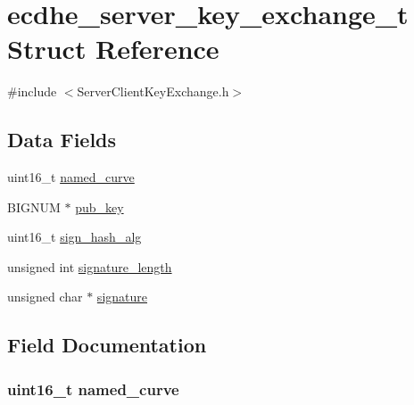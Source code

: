 \hypertarget{structecdhe__server__key__exchange__t}{}\section{ecdhe\+\_\+server\+\_\+key\+\_\+exchange\+\_\+t Struct Reference}
\label{structecdhe__server__key__exchange__t}


{\ttfamily \#include $<$Server\+Client\+Key\+Exchange.\+h$>$}

\subsection*{Data Fields}
\begin{DoxyCompactItemize}
\item 
uint16\+\_\+t \hyperlink{structecdhe__server__key__exchange__t_a5754cc60d6f7a74a313db0e4bc607b07}{named\+\_\+curve}
\item 
B\+I\+G\+N\+UM $\ast$ \hyperlink{structecdhe__server__key__exchange__t_aad713005343ebfb84e09a7441d655802}{pub\+\_\+key}
\item 
uint16\+\_\+t \hyperlink{structecdhe__server__key__exchange__t_a07ea01aadbb81f38a9a27e324d11f54e}{sign\+\_\+hash\+\_\+alg}
\item 
unsigned int \hyperlink{structecdhe__server__key__exchange__t_a23a683d5129246d9adbd0029612d06a8}{signature\+\_\+length}
\item 
unsigned char $\ast$ \hyperlink{structecdhe__server__key__exchange__t_a775505f2a74638cda44fdd79c4e07993}{signature}
\end{DoxyCompactItemize}


\subsection{Field Documentation}
\subsubsection[{\texorpdfstring{named\+\_\+curve}{named_curve}}]{\setlength{\rightskip}{0pt plus 5cm}uint16\+\_\+t named\+\_\+curve}\hypertarget{structecdhe__server__key__exchange__t_a5754cc60d6f7a74a313db0e4bc607b07}{}\label{structecdhe__server__key__exchange__t_a5754cc60d6f7a74a313db0e4bc607b07}



